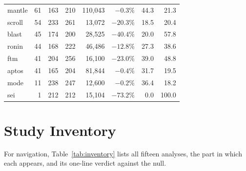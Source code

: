 \documentclass[12pt]{article}
\begin{document}
\begin{longtable}{lrrrrrrr}
mantle & 61 & 163 & 210 & 110{,}043 & $-0.3\%$ & 44.3 & 21.3\\
scroll & 54 & 233 & 261 & 13{,}072 & $-20.3\%$ & 18.5 & 20.4\\
blast & 45 & 174 & 200 & 28{,}525 & $-40.4\%$ & 20.0 & 57.8\\
ronin & 44 & 168 & 222 & 46{,}486 & $-12.8\%$ & 27.3 & 38.6\\
ftm & 41 & 204 & 256 & 16{,}100 & $-23.0\%$ & 39.0 & 48.8\\
aptos & 41 & 165 & 204 & 81{,}844 & $-0.4\%$ & 31.7 & 19.5\\
mode & 11 & 238 & 247 & 12{,}600 & $-0.2\%$ & 36.4 & 18.2\\
sei & 1 & 212 & 212 & 15{,}104 & $-73.2\%$ & 0.0 & 100.0\\
\end{longtable}
\endgroup

\section{Study Inventory}\label{app:inventory}
For navigation, Table~\ref{tab:inventory} lists all fifteen analyses, the part in which each appears, and its one-line verdict against the null.
\end{document}
